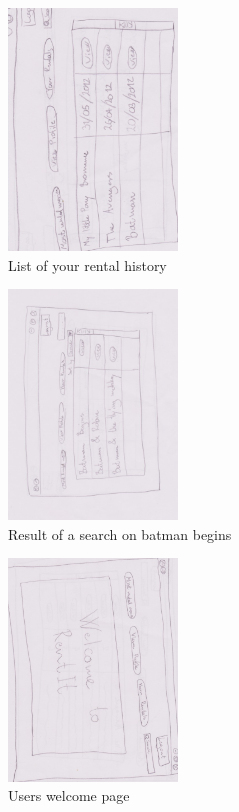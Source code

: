 \begin{figure}[!ht]
  \centering
    \includegraphics[angle=90, width=0.4\textwidth]{Parts/Appendix/Images/PaperMockup/RentalHistory}
  \caption{List of your rental history}
  \label{fig:Appendix_GUI_sketches_RentalHistory}
\end{figure}
\begin{figure}[!ht]
  \centering
    \includegraphics[angle=90, width=0.4\textwidth]{Parts/Appendix/Images/PaperMockup/Search}
  \caption{Result of a search on batman begins}
  \label{fig:Appendix_GUI_sketches_Search}
\end{figure}
\begin{figure}[!ht]
  \centering
    \includegraphics[angle=90, width=0.4\textwidth]{Parts/Appendix/Images/PaperMockup/UserWelcome}
  \caption{Users welcome page}
  \label{fig:Appendix_GUI_sketches_UserWelcome}
\end{figure}
